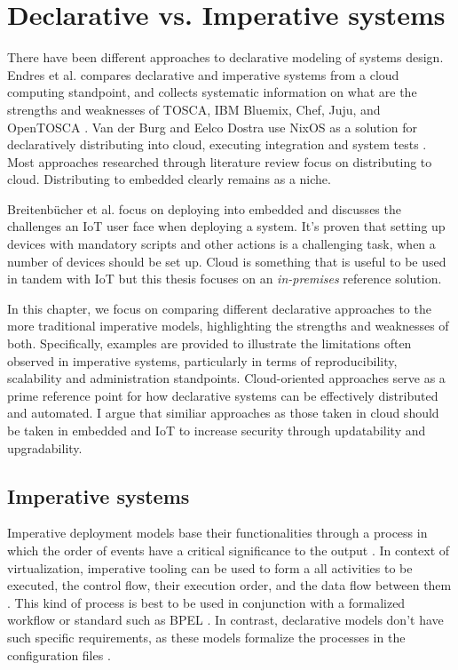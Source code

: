 \chapter{Declarative vs. Imperative systems} \label{imperative}

There have been different approaches to declarative modeling of
systems design. Endres et al. compares declarative and imperative
systems from a cloud computing standpoint, and collects systematic
information on what are the strengths and weaknesses of TOSCA, IBM
Bluemix, Chef, Juju, and OpenTOSCA \cite{endres2017declarative}. Van
der Burg and Eelco Dostra use NixOS as a solution for declaratively
distributing into cloud, executing integration and system tests
\cite{van2010declarative}. Most approaches researched through
literature review focus on distributing to cloud. Distributing to
embedded clearly remains as a niche.

Breitenbücher et al. focus on deploying into embedded and discusses
the challenges an IoT user face when deploying a system. It's proven
that setting up devices with mandatory scripts and other actions is a
challenging task, when a number of devices should be set up. Cloud is
something that is useful to be used in tandem with IoT but this thesis
focuses on an \textit{in-premises} reference
solution. \cite{breitenbucher2017declarative}

In this chapter, we focus on comparing different declarative
approaches to the more traditional imperative models, highlighting the
strengths and weaknesses of both. Specifically, examples are provided
to illustrate the limitations often observed in imperative systems,
particularly in terms of reproducibility, scalability and
administration standpoints. Cloud-oriented approaches serve as a prime
reference point for how declarative systems can be effectively
distributed and automated. I argue that similiar approaches as those
taken in cloud should be taken in embedded and IoT to increase security through updatability and upgradability.

\section{Imperative systems}

Imperative deployment models base their functionalities through a
process in which the order of events have a critical significance to
the output \cite{breitenbucher2017declarative}. In context of
virtualization, imperative tooling can be used to form a all
activities to be executed, the control flow, their execution order,
and the data flow between them \cite{endres2017declarative}. This kind
of process is best to be used in conjunction with a formalized
workflow or standard such as BPEL \cite{endres2017declarative}. In
contrast, declarative models don't have such specific requirements, as
these models formalize the processes in the configuration files
\cite{endres2017declarative}.

